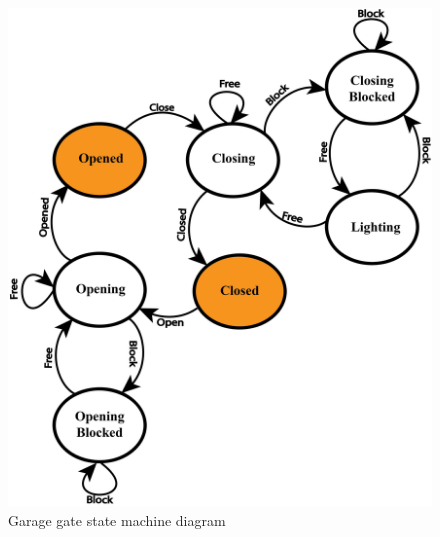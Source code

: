 \begin{figure}[!ht]
\centering
\includegraphics[width=150mm, keepaspectratio]{figures/garageState.png}
\caption{Garage gate state machine diagram}
\label{fig:Garage Statemachine}
\end{figure}

